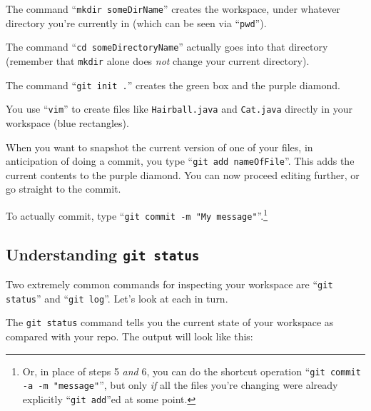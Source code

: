 \begin{compactenum}

\item The command ``{\small \texttt{mkdir someDirName}}'' creates the
workspace, under whatever directory you're currently in (which can be seen via
``{\small \texttt{pwd}}'').

\item The command ``{\small \texttt{cd someDirectoryName}}'' actually goes into
that directory (remember that \texttt{mkdir} alone does \textit{not} change
your current directory).

\item The command ``{\small \texttt{git init .}}'' creates the green box and
the purple diamond.

\item You use ``{\small \texttt{vim}}'' to create files like {\small
\texttt{Hairball.java}} and {\small \texttt{Cat.java}} directly in your
workspace (blue rectangles). \item When you want to snapshot the current
version of one of your files, in anticipation of doing a commit, you type
``{\small \texttt{git add nameOfFile}}''. This adds the current contents to the
purple diamond. You can now proceed editing further, or go straight to the
commit.

\item To actually commit, type ``{\small \texttt{git commit -m "My
message"}}''.\footnote{Or, in place of steps 5 \textit{and} 6, you can do the
shortcut operation ``\texttt{git commit -a -m "message"}'', but only
\textit{if} all the files you're changing were already explicitly ``\texttt{git
add}''ed at some point.}

\end{compactenum}

\subsection{Understanding \texttt{git status}}

Two extremely common commands for inspecting your workspace are ``\texttt{git
status}'' and ``\texttt{git log}''. Let's look at each in turn.


The {\small \texttt{git status}} command tells you the current state of your
workspace as compared with your repo. The output will look like this:

